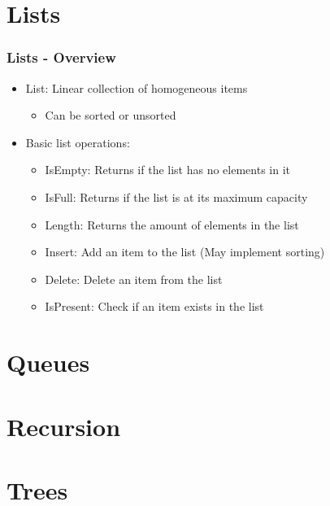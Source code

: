 \documentclass[c, aspectratio=169]{beamer}
\begin{document}
\section{Lists}
\begin{frame}\frametitle{Lists - Overview}
\begin{itemize}
\item List: Linear collection of homogeneous items
	\begin{itemize}
	\item Can be sorted or unsorted
	\end{itemize}
\item Basic list operations:
	\begin{itemize}
	\item IsEmpty: Returns if the list has no elements in it
	\item IsFull: Returns if the list is at its maximum capacity
	\item Length: Returns the amount of elements in the list
	\item Insert: Add an item to the list (May implement sorting)
	\item Delete: Delete an item from the list
	\item IsPresent: Check if an item exists in the list
	\end{itemize}
\end{itemize}
\end{frame}

\begin{frame}\end{frame}
\begin{frame}\end{frame}

\section{Queues}



\section{Recursion}

\section{Trees}






\end{document}
